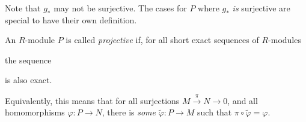 \documentclass[10pt]{mypackage}
\begin{document}
Note that $g_{\ast}$ may not be surjective. The cases for $P$ where $g_{\ast}$ \textit{is} surjective are special to have their own definition.
\begin{definition}
  An $R$-module $P$ is called \textit{projective} if, for all short exact sequences of $R$-modules
  \begin{center}
  \end{center}
  the sequence
  \begin{center}
  \end{center}
  is also exact.
\end{definition}
Equivalently, this means that for all surjections $M\xrightarrow{\pi}N\rightarrow 0$, and all homomorphisms $\varphi\colon P\rightarrow N$, there is \textit{some} $\widetilde{\varphi}\colon P\rightarrow M$ such that $\pi\circ \widetilde{\varphi} = \varphi$.
\begin{center}
\end{center}
\end{document}
